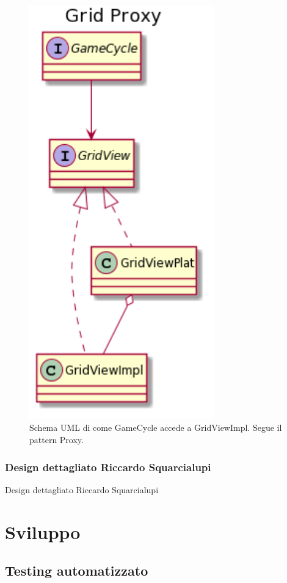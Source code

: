 \documentclass[a4paper,12pt]{report}
\begin{document}
	\begin{figure}[h]
	\centering{}
	\includegraphics[width=80mm]{images/ascenzo/grid_proxy.png}
	\caption{Schema UML di come GameCycle accede a GridViewImpl. Segue il pattern Proxy.}
	\label{img:gridmediator}
	\end{figure}

	\subsection{Design dettagliato Riccardo Squarcialupi}
	Design dettagliato Riccardo Squarcialupi

	\chapter{Sviluppo}
	\section{Testing automatizzato}
\end{document}

